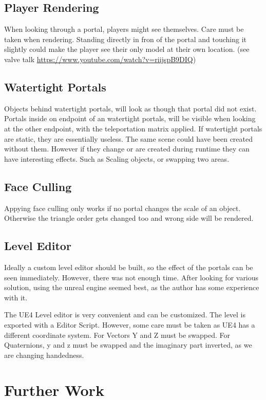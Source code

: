 \subsection{Player Rendering}
When looking through a portal, players might see themselves. Care must be taken when rendering. Standing directly in fron of the portal and touching it slightly could make the player see their only model at their own location. (see valve talk \url{https://www.youtube.com/watch?v=riijspB9DIQ})

\subsection{Watertight Portals}
Objects behind watertight portals, will look as though that portal did not exist. Portals inside on endpoint of an watertight portals, will be visible when looking at the other endpoint, with the teleportation matrix applied. If watertight portals are static, they are essentially useless. The same scene could have been created without them.
However if they change or are created during runtime they can have interesting effects. Such as Scaling objects, or swapping two areas.

\subsection{Face Culling}
Appying face culling only works if no portal changes the scale of an object. Otherwise the triangle order gets changed too and wrong side will be rendered.

\subsection{Level Editor}
Ideally a custom level editor should be built, so the effect of the portals can be seen immediately. However, there was not enough time. After looking for various solution, using the unreal engine seemed best, as the author has some experience with it.

The UE4 Level editor is very convenient and can be customized. The level is exported with a Editor Script. However, some care must be taken as UE4 has a different coordinate system. For Vectors Y and Z must be swapped. For Quaternions, y and z must be swapped and the imaginary part inverted, as we are changing handedness.


\section{Further Work}
